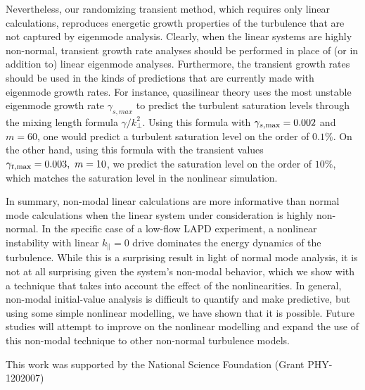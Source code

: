 \documentclass[letter,scriptaddress,twocolumn, prl,showkeys]{revtex4}
\def\para{\parallel}
\begin{document}
Nevertheless, our randomizing transient method, which requires only linear calculations, reproduces energetic growth properties of the turbulence that are not captured by eigenmode analysis.
Clearly, when the linear systems are highly non-normal, transient growth rate analyses should be performed in place of (or in addition to) linear eigenmode analyses. 
Furthermore, the transient growth rates should be used in the kinds of predictions that are currently made with eigenmode growth rates. 
For instance, quasilinear theory uses the most unstable eigenmode growth rate $\gamma_{s,max}$ to predict the turbulent saturation levels through the mixing length formula $\gamma/k_\perp^2$. 
Using this formula with $\gamma_{s,\rm{max}} = 0.002$ and $m=60$, one would predict a turbulent saturation level on the order of $0.1 \%$. 
On the other hand, using this formula with the transient values $\gamma_{t,\rm{max}} = 0.003, \ m=10$, we predict the saturation level on the order of $10 \%$,
which matches the saturation level in the nonlinear simulation.

In summary, non-modal linear calculations are more informative than normal mode calculations when the linear system under consideration is highly non-normal. In the specific case of a low-flow
LAPD experiment, a nonlinear instability with linear $k_\para=0$ drive dominates the energy dynamics of the turbulence. While this is a surprising result in light of normal mode analysis,
it is not at all surprising given the system's non-modal behavior, which we show with a technique that takes into account the effect of the nonlinearities. 
In general, non-modal initial-value analysis is difficult to quantify and make predictive, but using some simple nonlinear modelling, we have shown that it is possible. Future studies will
attempt to improve on the nonlinear modelling and expand the use of this non-modal technique to other non-normal turbulence models.

\begin{acknowledgments}
This work was supported by the National Science Foundation (Grant PHY-1202007)
\end{acknowledgments}





\end{document}
